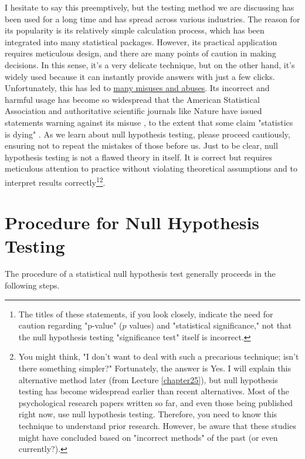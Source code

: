 \documentclass{ltjsbook}
\begin{document}
I hesitate to say this preemptively, but the testing method we are discussing has been used for a long time and has spread across various industries. The reason for its popularity is its relatively simple calculation process, which has been integrated into many statistical packages. However, its practical application requires meticulous design, and there are many points of caution in making decisions. In this sense, it's a very delicate technique, but on the other hand, it's widely used because it can instantly provide answers with just a few clicks. Unfortunately, this has led to \underline{many misuses and abuses}. Its incorrect and harmful usage has become so widespread that the American Statistical Association and authoritative scientific journals like Nature have issued statements warning against its misuse \parencite{wasserstein2016asa,amrhein2019scientists}, to the extent that some claim "statistics is dying" \parencite{Toyoda202003}. As we learn about null hypothesis testing, please proceed cautiously, ensuring not to repeat the mistakes of those before us. Just to be clear, null hypothesis testing is not a flawed theory in itself. It is correct but requires meticulous attention to practice without violating theoretical assumptions and to interpret results correctly\footnote{The titles of these statements, if you look closely, indicate the need for caution regarding "p-value" ($p$ values) and "statistical significance," not that the null hypothesis testing "significance test" itself is incorrect.}\footnote{You might think, "I don't want to deal with such a precarious technique; isn't there something simpler?" Fortunately, the answer is Yes. I will explain this alternative method later (from Lecture \ref{chapter25}), but null hypothesis testing has become widespread earlier than recent alternatives. Most of the psychological research papers written so far, and even those being published right now, use null hypothesis testing. Therefore, you need to know this technique to understand prior research. However, be aware that these studies might have concluded based on "incorrect methods" of the past (or even currently?).}.

\section{Procedure for Null Hypothesis Testing}
The procedure of a statistical null hypothesis test generally proceeds in the following steps.

\end{document}
